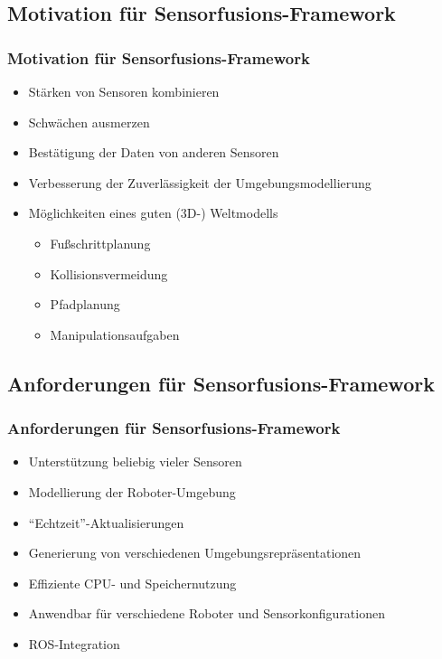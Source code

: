 \subsection*{Motivation für Sensorfusions-Framework}
\begin{frame}[t]
    \frametitle{Motivation für Sensorfusions-Framework}

    \begin{itemize}
      \item Stärken von Sensoren kombinieren
      \item Schwächen ausmerzen
      \item Bestätigung der Daten von anderen Sensoren
      \item Verbesserung der Zuverlässigkeit der Umgebungsmodellierung
      \item Möglichkeiten eines guten (3D-) Weltmodells
      \begin{itemize}
	\item Fußschrittplanung
	\item Kollisionsvermeidung
	\item Pfadplanung
	\item Manipulationsaufgaben
      \end{itemize}

\end{itemize}
\end{frame}


\subsection*{Anforderungen für Sensorfusions-Framework}






\begin{frame}[t]
  \frametitle{Anforderungen für Sensorfusions-Framework}
      
  \begin{itemize}
      \item Unterstützung beliebig vieler Sensoren
      \item Modellierung der Roboter-Umgebung 
      \item "`Echtzeit"'-Aktualisierungen
      \item Generierung von verschiedenen Umgebungsrepräsentationen

      \item Effiziente CPU- und Speichernutzung
      \item Anwendbar für verschiedene Roboter und Sensorkonfigurationen
      \item ROS-Integration
  \end{itemize}

     

\end{frame}    




